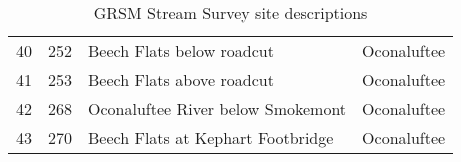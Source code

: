 \begin{table}[h]
\begin{flushleft}
\begin{tabular}{ccll}
40 & 252       & Beech Flats below roadcut                                    & Oconaluftee \\ 
41 & 253       & Beech Flats above roadcut                                   & Oconaluftee \\ 
42 & 268       & Oconaluftee River below Smokemont                   & Oconaluftee \\ 
43 & 270       & Beech Flats at Kephart Footbridge                       & Oconaluftee \\  
\bottomrule
\end{tabular}
\end{flushleft}
\caption{GRSM Stream Survey site descriptions}
\label{tab:Site Data}
\end{table}